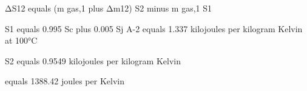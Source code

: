ΔS12 equals (m gas,1 plus Δm12) S2 minus m gas,1 S1  

S1 equals 0.995 Sc plus 0.005 Sj  
A-2 equals 1.337 kilojoules per kilogram Kelvin at 100°C  

S2 equals 0.9549 kilojoules per kilogram Kelvin  

equals 1388.42 joules per Kelvin